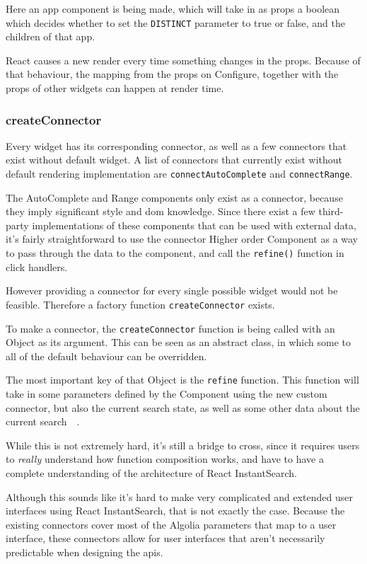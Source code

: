 Here an app component is being made, which will take in as \gls{props} a boolean which decides whether to set the {\tt DISTINCT} parameter to true or false, and the children of that app.

React causes a new render every time something changes in the \gls{props}. Because of that behaviour, the mapping from the \gls{props} on Configure, together with the \gls{props} of other widgets can happen at render time.

\subsubsection{createConnector}
\label{ssub:ris-createconnector}

Every widget has its corresponding connector, as well as a few connectors that exist without default widget. A list of connectors that currently exist without default rendering implementation are {\tt connectAutoComplete} and {\tt connectRange}.

The AutoComplete and Range components only exist as a connector, because they imply significant style and \acrshort{dom} knowledge. Since there exist a few third-party implementations of these components that can be used with external data, it's fairly straightforward to use the connector Higher order Component as a way to pass through the data to the component, and call the {\tt refine()} function in click handlers. 

However providing a connector for every single possible widget would not be feasible. Therefore a factory function {\tt createConnector} exists.

To make a connector, the {\tt createConnector} function is being called with an Object as its argument. This can be seen as an abstract class, in which some to all of the default behaviour can be overridden. 

The most important key of that Object is the {\tt refine} function. This function will take in some parameters defined by the Component using the new custom connector, but also the current search state, as well as some other data about the current search~\cite{react-instantsearch-custom-connectors}~.

While this is not extremely hard, it's still a bridge to cross, since it requires users to \emph{really} understand how function composition works, and have to have a complete understanding of the architecture of React InstantSearch.

Although this sounds like it's hard to make very complicated and extended user interfaces using React InstantSearch, that is not exactly the case. Because the existing connectors cover most of the Algolia parameters that map to a user interface, these connectors allow for user interfaces that aren't necessarily predictable when designing the \acrshort{api}s. 

